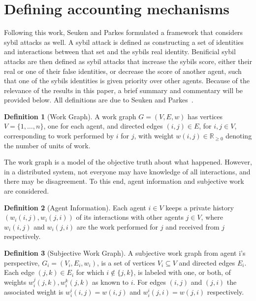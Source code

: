 \documentclass[a4paper,11pt]{book}
\newcommand{\bb}{\mathbb}
\theoremstyle{definition}
\newtheorem{definition}{Definition}
\begin{document}
\section{Defining accounting mechanisms}

Following this work, Seuken and Parkes \cite{seuken2014sybil} formulated a framework that considers sybil attacks as well. 
A sybil attack is defined as constructing a set of identities and interactions between that set and the sybils real identity.
Benificial sybil attacks are then defined as sybil attacks that increase the sybils score, either their real or one of
their false identities, or decrease the score of another  agent, such that one of the sybils identities
is given priority over other agents. Because of the relevance of the results in this paper, a brief summary
and commentary will be provided below. All definitions are due to Seuken and Parkes~\cite{seuken2014sybil}.

\begin{definition}[Work Graph]
    A work graph $G = (V, E, w)$ has vertices $V = \{1, \ldots, n\}$, one for each agent, and directed
    edges $(i, j) \in E$, for $i, j \in V$, corresponding to work performed by $i$ for $j$, with weight
    $w(i,j) \in \bb{R}_{\geq0}$ denoting the number of units of work.
    \label{def:work_graph}
\end{definition}

The work graph is a model of the objective truth about what happened. However, in a distributed system,
not everyone may have knowledge of all interactions, and there may be disagreement. To this end, agent
information and subjective work are considered.

\begin{definition}[Agent Information]
   Each agent $i \in V$ keeps a private history $(w_i(i,j), w_i(j, i))$ of its interactions with
   other agents $j \in V$, where $w_i(i,j)$ and $w_i(j,i)$ are the work performed for $j$ and
   received from $j$ respectively.
\end{definition}

\begin{definition}[Subjective Work Graph]
   A subjective work graph from agent i's perspective, $G_i = (V_i, E_i, w_i)$, is a set of vertices
   $V_i \subseteq V$ and directed edges $E_i$. Each edge $(j, k) \in E_i$ for which $i \notin \{j, k\}$,
   is labeled with one, or both, of weights $w^j_i(j, k), w_i^k(j, k)$ as known to $i$. For edges $(i,j)$
   and $(j,i)$ the associated weight is $w_i^i(i,j) = w(i,j)$ and $w_i^i(j, i) = w(j,i)$ respectively.
\end{definition}
\end{document}
